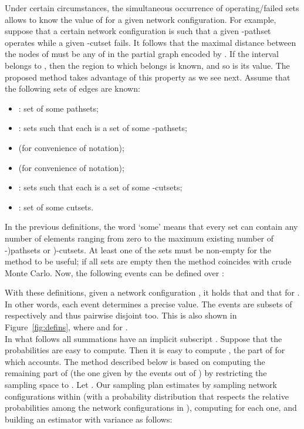 \documentclass[a4paper]{article}
\begin{document}
Under certain circumstances, the simultaneous occurrence of operating/failed sets allows to know the value of  for a given network configuration. For example, suppose that a certain network configuration  is such that a given \mbox{-pathset} operates while a given \mbox{-cutset} fails. It follows that the maximal distance between the nodes of  must be any of  in the partial graph encoded by . If the interval  belongs to , then the region to which  belongs is known, and so is its  value. The proposed method takes advantage of this property as we see next. Assume that the following sets of edges are known:

\begin{itemize}
\item : set of some pathsets;
\item :  sets such that each  is a set of some \mbox{-pathsets};
\item  (for convenience of notation);
\item  (for convenience of notation);
\item :  sets such that each  is a set of some \mbox{-cutsets};
\item : set of some cutsets.
\end{itemize}

In the previous definitions, the word `some' means that every set can contain any number of elements ranging from zero to the maximum existing number of \mbox{-)pathsets} or \mbox{)-cutsets}. At least one of the sets must be non-empty for the method to be useful; if all sets are empty then the method coincides with crude Monte Carlo. Now, the following events can be defined over :



With these definitions, given a network configuration , it holds that  and that  for . In other words, each event  determines a precise  value. The events  are subsets of  respectively and thus pairwise disjoint too. This is also shown in Figure~\ref{fig:defins}, where  and  for .\\

In what follows all summations have an implicit subscript . Suppose that the probabilities  are easy to compute. Then it is easy to compute ,  the part of  for which  accounts. The method described below is based on computing the remaining part of  (the one given by the events out of ) by restricting the sampling space to . Let . Our sampling plan estimates  by sampling  network configurations  within  (with a probability distribution that respects the relative probabilities among the network configurations in ), computing  for each one, and building an estimator  with variance  as follows:
\end{document}
